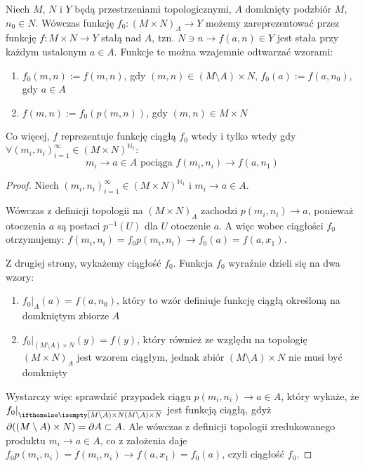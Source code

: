 \begin{lem} \label{lem:reduced-product-continuous}
  Niech $M$, $N$ i $Y$ będą przestrzeniami topologicznymi, $A$ domknięty podzbiór $M$, $n_0 \in N$. Wówczas funkcję $f_0: (M \times N)_A \rightarrow Y$ możemy zareprezentować przez funkcję $f: M \times N \rightarrow Y$ stałą nad $A$, tzn. $N \ni n \rightarrow f(a, n) \in Y$ jest stała przy każdym ustalonym $a \in A$. Funkcje te można wzajemnie odtwarzać wzorami:
  \begin{enumerate}
   \item $f_0(m,n) := f(m,n)$, gdy $(m,n) \in (M \setminus A) \times N$, $f_0(a) := f(a, n_0)$, gdy $a \in A$
   \item $f(m,n) := f_0(p(m,n))$, gdy $(m,n) \in M \times N$
  \end{enumerate}

  
  Co więcej, $f$ reprezentuje funkcję ciągłą $f_0$ wtedy i tylko wtedy gdy $\forall (m_i, n_i)_{i=1}^\infty \in (M \times N)^{\mathbb{N}_1}:$
  \[m_i \rightarrow a \in A \mbox{ pociąga } f(m_i, n_i) \rightarrow f(a, n_1)\]
  
  \begin{proof}
    Niech $(m_i, n_i)_{i=1}^\infty \in (M \times N)^{\mathbb{N}_1}$ i $m_i \rightarrow a \in A$.
    
    Wówczas z definicji topologii na $(M \times N)_A$ zachodzi $p(m_i, n_i) \rightarrow a$, ponieważ otoczenia $a$ są postaci $p^{-1}(U)$ dla $U$ otoczenie $a$. A więc wobec ciągłości $f_0$ otrzymujemy: $f(m_i, n_i) = f_0 p(m_i, n_i) \rightarrow f_0(a) = f(a, x_1)$.
    
    Z drugiej strony, wykażemy ciągłość $f_0$. Funkcja $f_0$ wyraźnie dzieli się na dwa wzory:
    \begin{enumerate}
     \item $f_0|_A(a) = f(a, n_0)$, który to wzór definiuje funkcję ciągłą określoną na domkniętym zbiorze $A$
     \item $f_0|_{(M \setminus A) \times N}(y) = f(y)$, który również ze względu na topologię $(M \times N)_A$ jest wzorem ciągłym, jednak zbiór $(M \setminus A) \times N$ nie musi być domknięty
    \end{enumerate}
    Wystarczy więc sprawdzić przypadek ciągu $p(m_i, n_i) \rightarrow a \in A$, który wykaże, że $f_0|_{\cl{(M \setminus A) \times N}}$ jest funkcją ciągłą, gdyż $\partial((M \setminus A) \times N) = \partial A \subset A$. Ale wówczas z definicji topologii zredukowanego produktu $m_i \rightarrow a \in A$, co z założenia daje $f_0 p(m_i, n_i) = f(m_i, n_i) \rightarrow f(a, x_1) = f_0(a)$, czyli ciągłość $f_0$.
  \end{proof}
\end{lem}

